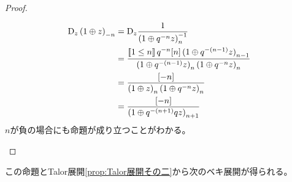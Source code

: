 {\begin{proof}
\begin{enumerate}
\begin{equation*}
\begin{split}
				{\mathinner{\operatorname{D}}}_z\mathinner{({1\oplus z})}_{-n} 
				&= {\mathinner{\operatorname{D}}}_z\frac{1}{\mathinner{({1\oplus q^{-n}z})}_n^{-1}} \\
				&= \frac{\mathinner{[\![1\le n]\!]}q^{-n}{\mathinner{[{n}]}}\mathinner{({1\oplus q^{-\mathinner{({n-1})}}z})}_{n-1}}
					{\mathinner{({1\oplus q^{-\mathinner{({n-1})}}z})}_n\mathinner{({1\oplus q^{-n}z})}_n} \\
				&= \frac{{\mathinner{[{-n}]}}}{\mathinner{({1\oplus z})}_n\mathinner{({1\oplus q^{-n}z})}_n} \\
				&= \frac{{\mathinner{[{-n}]}}}{\mathinner{({1\oplus q^{-\mathinner{({n+1})}}qz})}_{n+1}} \\
			\end{split}\end{equation*}
			$n$が負の場合にも命題が成り立つことがわかる。
		\end{enumerate} %
	\end{proof} %

	この命題とTalor展開\ref{prop:Talor展開その二}から次のベキ展開が得られる。

}
